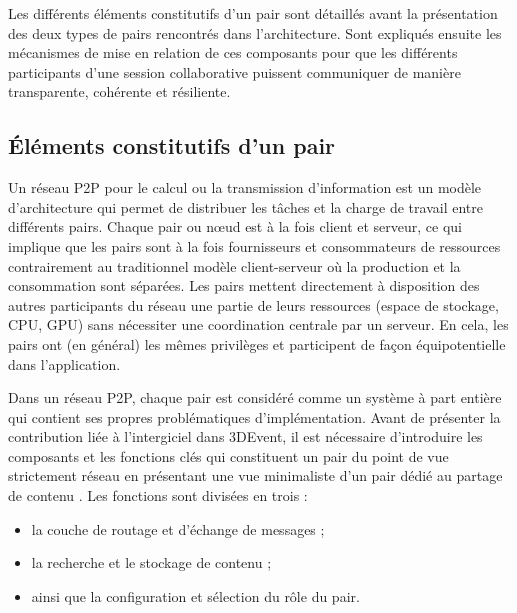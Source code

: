 Les différents éléments constitutifs d'un pair sont détaillés avant la présentation 
des deux types de pairs rencontrés dans l'architecture.
Sont expliqués ensuite les mécanismes de mise en relation de 
ces composants pour que les différents participants d'une session 
collaborative puissent communiquer de manière transparente, cohérente et 
résiliente.



\subsection{Éléments constitutifs d'un pair}
Un réseau \gls{P2P} pour le calcul ou la transmission d’information est un modèle 
d’architecture qui permet de distribuer les tâches et la charge de travail entre 
différents pairs. Chaque pair ou \og n\oe ud\fg{} est à la fois client et serveur, ce 
qui implique que les pairs sont à la fois fournisseurs et consommateurs de 
ressources contrairement au traditionnel modèle client-serveur où la production et 
la consommation sont séparées. Les pairs mettent directement à disposition des 
autres participants du réseau une partie de leurs ressources (espace de stockage, 
CPU, GPU) sans nécessiter une coordination centrale par un serveur. En cela, les 
pairs ont (en général) les mêmes privilèges et participent de façon équipotentielle 
dans l’application.

Dans un réseau \gls{P2P}, chaque pair est considéré comme un système à part 
entière qui contient ses propres problématiques d'implémentation. Avant de 
présenter la contribution liée à l'intergiciel dans 3DEvent, il est 
nécessaire 
d'introduire les composants et les fonctions clés qui constituent un pair du point de 
vue strictement réseau en 
présentant une vue minimaliste d'un pair dédié au partage de contenu 
\cite[p.135-136]{Buford2009}. Les 
fonctions sont divisées en trois :
\begin{itemize}
	\item la couche de routage et d'échange de messages ;
	\item la recherche et le stockage de contenu ;
	\item ainsi que la configuration et sélection du rôle du pair.
\end{itemize}


